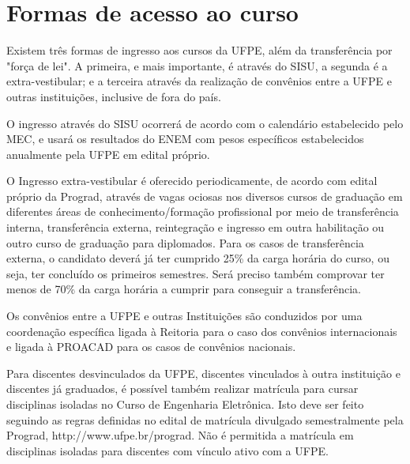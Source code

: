 \chapter{Formas de acesso ao curso}
\label{cap10}

Existem três formas de ingresso aos cursos da UFPE, além da transferência por "força de lei". A primeira, e mais importante, é através do SISU, a segunda é a extra-vestibular; e a terceira através da realização de convênios entre a UFPE e outras instituições, inclusive de fora do país.

O ingresso através do SISU ocorrerá de acordo com o calendário estabelecido pelo MEC, e usará os resultados do ENEM com pesos específicos estabelecidos anualmente pela UFPE em edital próprio.

O Ingresso extra-vestibular é oferecido periodicamente, de acordo com edital próprio da Prograd, através de vagas ociosas nos diversos cursos de graduação em diferentes áreas de conhecimento/formação profissional por meio de transferência interna, transferência externa, reintegração e ingresso em outra habilitação ou outro curso de graduação para diplomados. Para os casos de transferência externa, o candidato deverá já ter cumprido 25\% da carga horária do curso, ou seja, ter concluído os primeiros semestres. Será preciso também comprovar ter menos de 70\% da carga horária a cumprir para conseguir a transferência.

Os convênios entre a UFPE e outras Instituições são conduzidos por uma coordenação específica ligada à Reitoria para o caso dos convênios internacionais e ligada à PROACAD para os casos de convênios nacionais.

Para discentes desvinculados da UFPE, discentes vinculados à outra instituição e discentes já graduados, é possível também realizar matrícula para cursar disciplinas isoladas no Curso de Engenharia Eletrônica. Isto deve ser feito seguindo as regras definidas no edital de matrícula divulgado semestralmente pela Prograd, http://www.ufpe.br/prograd. Não é permitida a matrícula em disciplinas isoladas para discentes com vínculo ativo com a UFPE.

